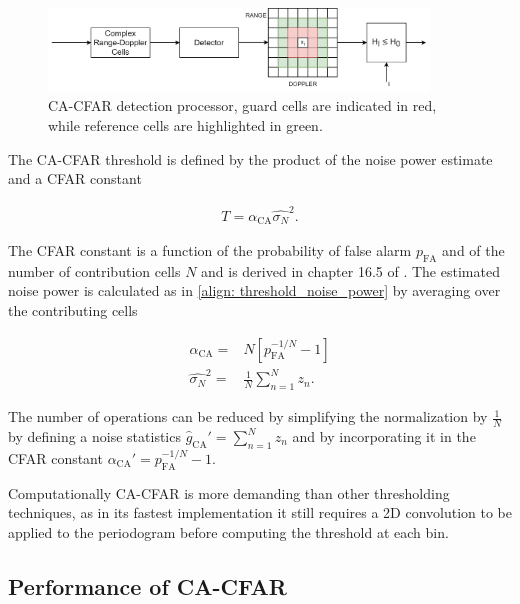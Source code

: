 \begin{figure}[H]
	\centering
	\includegraphics[width=0.9\textwidth]{Images/radar_detect_threshold/cacfar_pipeline.png}
	\caption{CA-CFAR detection processor, guard cells are indicated in red, while reference cells are highlighted in green.}
	\label{fig:cacfar_pipeline}
\end{figure}



The CA-CFAR threshold is defined by the product of the noise power estimate and a CFAR constant

\begin{align}
	T = \alpha_{\text{CA}} \hat{\sigma_N}^2.
\end{align}

The CFAR constant is a function of the probability of false alarm $p_{\text{FA}}$ and of the number of contribution cells $N$ and is derived in chapter 16.5 of \cite{Richards_Scheer_Holm_2010}. The estimated noise power is calculated as in \ref{align: threshold_noise_power} by averaging over the contributing cells

\begin{align}
	\alpha_{\text{CA}} =& N[p_{\text{FA}}^{-1/N} - 1] \\
	\hat{\sigma_N}^2 =& \frac{1}{N}\sum_{n=1}^N z_n.
\end{align}

The number of operations can be reduced by simplifying the normalization by $\frac{1}{N}$ by defining a noise statistics $\hat{g}_{\text{CA}}' = \sum_{n=1}^N z_n$ and by incorporating it in the CFAR constant $\alpha_{\text{CA}}' = p_{\text{FA}}^{-1/N} - 1$.

Computationally CA-CFAR is more demanding than other thresholding techniques, as in its fastest implementation it still requires a 2D convolution to be applied to the periodogram before computing the threshold at each bin.

\subsection{Performance of CA-CFAR}

